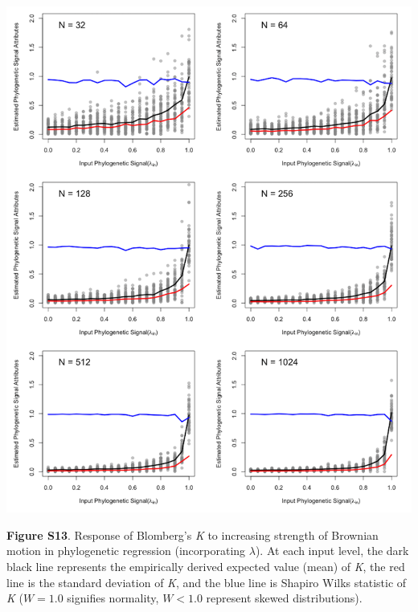\documentclass[
]{article}
\begin{document}
\includegraphics[width=0.95\linewidth]{fig.S13}

\textbf{Figure S13}. Response of Blomberg's \textit{K} to increasing
strength of Brownian motion in phylogenetic regression (incorporating
\(\lambda\)). At each input level, the dark black line represents the
empirically derived expected value (mean) of \textit{K}, the red line is
the standard deviation of \textit{K}, and the blue line is Shapiro Wilks
statistic of \textit{K} (\(W=1.0\) signifies normality, \(W< 1.0\)
represent skewed distributions).
\end{document}
